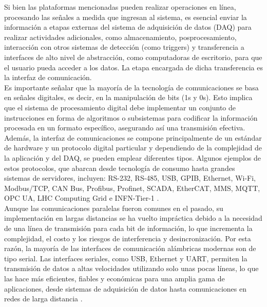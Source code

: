 \documentclass{report}
\begin{document}
\noindent Si bien las plataformas mencionadas pueden realizar operaciones en línea, procesando las señales a medida que ingresan al sistema, es esencial enviar la información a etapas externas del sistema de adquisición de datos (DAQ) para realizar actividades adicionales, como almacenamiento, posprocesamiento, interacción con otros sistemas de detección (como triggers) y transferencia a interfaces de alto nivel de abstracción, como computadoras de escritorio, para que el usuario pueda acceder a los datos. La etapa encargada de dicha transferencia es la interfaz de comunicación. \\

\noindent Es importante señalar que la mayoría de la tecnología de comunicaciones se basa en señales digitales, es decir, en la manipulación de bits (1s y 0s). Esto implica que el sistema de procesamiento digital debe implementar un conjunto de instrucciones en forma de algoritmos o subsistemas para codificar la información procesada en un formato específico, asegurando así una transmisión efectiva. Además, la interfaz de comunicaciones se compone principalmente de un estándar de hardware y un protocolo digital particular y dependiendo de la complejidad de la aplicación y del DAQ, se pueden emplear diferentes tipos. Algunos ejemplos de estos protocolos, que abarcan desde tecnología de consumo hasta grandes sistemas de servidores, incluyen: RS-232, RS-485, USB, GPIB, Ethernet, Wi-Fi, Modbus/TCP, CAN Bus, Profibus, Profinet, SCADA, EtherCAT, MMS, MQTT, OPC UA, LHC Computing Grid e INFN-Tier-1 \cite{zurawski2014industrial} \cite{bortolotti2012infn}.\\

\noindent Aunque las comunicaciones paralelas fueron comunes en el pasado, su implementación en largas distancias se ha vuelto impráctica debido a la necesidad de una línea de transmisión para cada bit de información, lo que incrementa la complejidad, el costo y los riesgos de interferencia y desincronización. Por esta razón, la mayoría de las interfaces de comunicación alámbricas modernas son de tipo serial. Las interfaces seriales, como USB, Ethernet y UART, permiten la transmisión de datos a altas velocidades utilizando solo unas pocas líneas, lo que las hace más eficientes, fiables y económicas para una amplia gama de aplicaciones, desde sistemas de adquisición de datos hasta comunicaciones en redes de larga distancia \cite{eeeguide_serial_communication_8251}.\\
\end{document}
